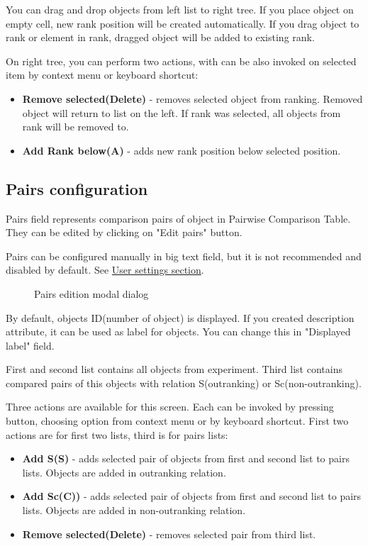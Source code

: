 You can drag and drop objects from left list to right tree. If you place object on empty cell, new rank position will be created automatically. If you drag object to rank or element in rank, dragged object will be added to existing rank.

On right tree, you can perform two actions, with can be also invoked on selected item by context menu or keyboard shortcut:
\begin{itemize}
	\item \textbf{Remove selected(Delete)} - removes selected object from ranking. Removed object will return to list on the left. If rank was selected, all objects from rank will be removed to.
	\item \textbf{Add Rank below(A)} - adds new rank position below selected position.
\end{itemize}


\subsection{Pairs configuration}\label{sub:properties-pairs}

Pairs field represents comparison pairs of object in Pairwise Comparison Table. They can be edited by clicking on "Edit pairs" button.

Pairs can be configured manually in big text field, but it is not recommended and disabled by default. See \hyperref[section:user-settings]{User settings section}.

\begin{figure*}[!ht] 
	\centering
	\caption{Pairs edition modal dialog}
\end{figure*}

By default, objects ID(number of object) is displayed. If you created description attribute, it can be used as label for objects. You can change this in "Displayed label" field. 

First and second list contains all objects from experiment. Third list contains compared pairs of this objects with relation S(outranking) or Sc(non-outranking).

Three actions are available for this screen. Each can be invoked by pressing button, choosing option from context menu or by keyboard shortcut. First two actions are for first two lists, third is for pairs lists:
\begin{itemize}
	\item \textbf{Add S(S)} - adds selected pair of objects from first and second list to pairs lists. Objects are added in outranking relation.
	\item \textbf{Add Sc(C))} - adds selected pair of objects from first and second list to pairs lists. Objects are added in non-outranking relation.
	\item \textbf{Remove selected(Delete)} - removes selected pair from third list.
\end{itemize}



\vfill\newpage